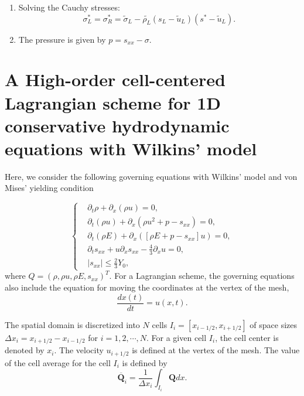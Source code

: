 \documentclass{article}
\numberwithin{equation}{section}
\numberwithin{table}{section}
\begin{document}
\begin{enumerate}
\begin{enumerate}
    \item Solving the Cauchy stresses:
\begin{equation*}
  \sigma_L^*=\sigma_R^*=\widetilde{\sigma}_L -\widetilde{\rho_L} (s_L-\widetilde{u}_L)(s^*-\widetilde{u}_L).
\end{equation*}

     \item The pressure is given by $p =s_{xx}-\sigma$.
  \end{enumerate}
\end{enumerate}

 \section{ A High-order cell-centered Lagrangian scheme for 1D  conservative hydrodynamic equations with Wilkins' model}
Here, we consider the following governing equations with Wilkins' model  and von Mises' yielding condition

\begin{equation}\label{eq:gveq}
   \left\{ \begin{aligned}
	   & \partial _t \rho +\partial_x(\rho u)=0,\\
	   & \partial _t (\rho u)+\partial_x(\rho u^2 + p -s_{xx})=0,\\
	   &\partial _t (\rho E)+\partial_x([\rho E + p -s_{xx}]u)=0,\\
	   &\partial _t s_{xx}+u\partial_xs_{xx}-\frac{4}{3}\partial_x u=0,\\
& |s_{xx}|\leq\frac{2}{3}Y_{0},
	   \end{aligned}\right.
\end{equation}
where $Q = (\rho, \rho u, \rho E, s_{xx})^T$.  For a Lagrangian scheme, the governing equations also include the equation for moving the coordinates at the vertex of the mesh,
\begin{equation}\label{eq:dxt}
  \frac{dx(t)}{dt} = u(x,t).
\end{equation}

The spatial domain is discretized into $N$ cells $I_i = [x_{i-1/2}, x_{i+1/2}]$ of space sizes $\Delta x_i = x_{i+1/2} - x_{i-1/2}$ for $i = 1,2,\cdots,N$. For a given cell $I_i$, the cell center is denoted by $x_i$. The velocity $u_{i+1/2}$ is defined at the vertex of the mesh. The  value of the cell average for the cell $I_i$ is defined by
\begin{equation}
  \overline{\bm{Q}}_i = \frac{1}{\Delta x_i} \int_{I_i} \bm{Q} dx.
\end{equation}
\end{document}
